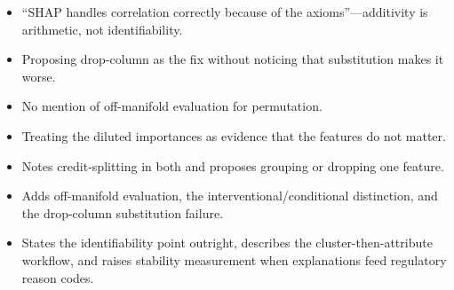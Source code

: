 \begin{interviewq}
\redflags
\begin{itemize}
    \item ``SHAP handles correlation correctly because of the axioms''---additivity is arithmetic, not identifiability.
    \item Proposing drop-column as the fix without noticing that substitution makes it worse.
    \item No mention of off-manifold evaluation for permutation.
    \item Treating the diluted importances as evidence that the features do not matter.
\end{itemize}


\goodgreat
\begin{itemize}
    \item {} Notes credit-splitting in both and proposes grouping or dropping one feature.
    \item {} Adds off-manifold evaluation, the interventional/conditional distinction, and the drop-column substitution failure.
    \item {} States the identifiability point outright, describes the cluster-then-attribute workflow, and raises stability measurement when explanations feed regulatory reason codes.
\end{itemize}

\end{interviewq}

